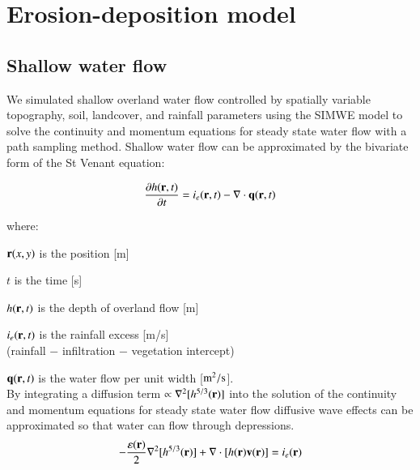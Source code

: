 \documentclass[final,3p,times,twocolumn]{elsarticle}
\begin{document}
\section{Erosion-deposition model} \label{erdep_model}


\subsection{Shallow water flow}

We simulated shallow overland water flow controlled by spatially variable topography, soil, landcover, and rainfall parameters using the SIMWE model to solve the continuity and momentum equations for steady state water flow with a path sampling method. 
%
Shallow water flow can be approximated by
the bivariate form of the St Venant equation:

\begin{equation}
\label{eq:water}
{\partial h({\bf r},t) \over \partial t} =
 i_e({\bf r},t) - \nabla \cdot {\bf q}({\bf r},t)
\end{equation}

\noindent
where:

\hspace*{1em} ${\bf r}(x,y)$ is the position [m]

\hspace*{1em} $t$ is the time [s]

\hspace*{1em} $h({\bf r},t)$ is the depth of overland flow [m]

\hspace*{1em} $i_e({\bf r},t)$ is the rainfall excess [m/s]\\
\hspace*{1em} (rainfall $-$ infiltration $-$ vegetation intercept) 

\hspace*{1em} ${\bf q}({\bf r},t)$ is the water flow per unit width [$\rm m^2/s$]. \\



By integrating a diffusion term $ \propto \nabla^2 [h^{5/3}({\bf r})]$ 
into
the solution of the continuity and momentum equations for steady state water flow
diffusive wave effects can be approximated
so that water can flow through depressions. 
%
\begin{equation}
\label{eq:difwater}
-{\varepsilon({\bf r})\over 2 }\nabla^2 [h^{5/3}({\bf r})]
+\nabla \cdot [ h({\bf r}){\bf v}({\bf r})] = i_e({\bf r})
\end{equation}
\end{document}

